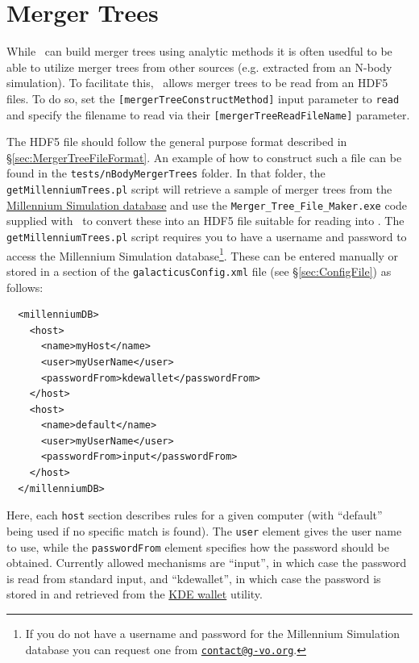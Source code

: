 \section{Merger Trees}\label{sec:MergerTreeFiles}

While \glc\ can build merger trees using analytic methods it is often usedful to be able to utilize merger trees from other sources (e.g. extracted from an N-body simulation). To facilitate this, \glc\ allows merger trees to be read from an HDF5 files. To do so, set the {\tt [mergerTreeConstructMethod]} input parameter to {\tt read} and specify the filename to read via their {\tt [mergerTreeReadFileName]} parameter.

The HDF5 file should follow the general purpose format described in \S\ref{sec:MergerTreeFileFormat}. An example of how to construct such a file can be found in the {\tt tests/nBodyMergerTrees} folder. In that folder, the {\tt getMillenniumTrees.pl} script will retrieve a sample of merger trees from the \href{http://www.g-vo.org/MyMillennium3/}{Millennium Simulation database} and use the {\tt Merger\_Tree\_File\_Maker.exe} code supplied with \glc\ to convert these into an HDF5 file suitable for reading into \glc. The {\tt getMillenniumTrees.pl} script requires you to have a username and password to access the Millennium Simulation database\footnote{If you do not have a username and password for the Millennium Simulation database you can request one from \href{mailto:contact@g-vo.org}{\tt contact@g-vo.org}.}. These can be entered manually or stored in a section of the {\tt galacticusConfig.xml} file (see \S\ref{sec:ConfigFile}) as follows:
\begin{verbatim}
  <millenniumDB>
    <host>
      <name>myHost</name>
      <user>myUserName</user>
      <passwordFrom>kdewallet</passwordFrom>
    </host>
    <host>
      <name>default</name>
      <user>myUserName</user>
      <passwordFrom>input</passwordFrom>
    </host>
  </millenniumDB>
\end{verbatim}
Here, each {\tt host} section describes rules for a given computer (with ``default'' being used if no specific match is found). The {\tt user} element gives the user name to use, while the {\tt passwordFrom} element specifies how the password should be obtained. Currently allowed mechanisms are ``input'', in which case the password is read from standard input, and ``kdewallet'', in which case the password is stored in and retrieved from the \href{http://utils.kde.org/projects/kwalletmanager/}{KDE wallet} utility.

